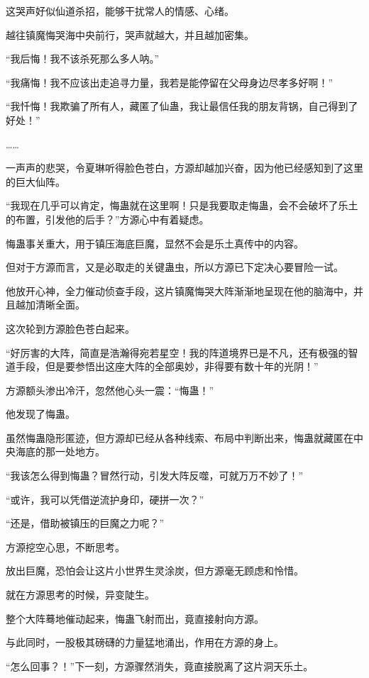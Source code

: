 \begin{this_body}
这哭声好似仙道杀招，能够干扰常人的情感、心绪。

越往镇魔悔哭海中央前行，哭声就越大，并且越加密集。

“我后悔！我不该杀死那么多人呐。”

“我痛悔！我不应该出走追寻力量，我若是能停留在父母身边尽孝多好啊！”

“我忏悔！我欺骗了所有人，藏匿了仙蛊，我让最信任我的朋友背锅，自己得到了好处！”

……

一声声的悲哭，令夏琳听得脸色苍白，方源却越加兴奋，因为他已经感知到了这里的巨大仙阵。

“我现在几乎可以肯定，悔蛊就在这里啊！只是我要取走悔蛊，会不会破坏了乐土的布置，引发他的后手？”方源心中有着疑虑。

悔蛊事关重大，用于镇压海底巨魔，显然不会是乐土真传中的内容。

但对于方源而言，又是必取走的关键蛊虫，所以方源已下定决心要冒险一试。

他放开心神，全力催动侦查手段，这片镇魔悔哭大阵渐渐地呈现在他的脑海中，并且越加清晰全面。

这次轮到方源脸色苍白起来。

“好厉害的大阵，简直是浩瀚得宛若星空！我的阵道境界已是不凡，还有极强的智道手段，但是要参悟出这座大阵的全部奥妙，非得要有数十年的光阴！”

方源额头渗出冷汗，忽然他心头一震：“悔蛊！”

他发现了悔蛊。

虽然悔蛊隐形匿迹，但方源却已经从各种线索、布局中判断出来，悔蛊就藏匿在中央海底的那一处地方。

“我该怎么得到悔蛊？冒然行动，引发大阵反噬，可就万万不妙了！”

“或许，我可以凭借逆流护身印，硬拼一次？”

“还是，借助被镇压的巨魔之力呢？”

方源挖空心思，不断思考。

放出巨魔，恐怕会让这片小世界生灵涂炭，但方源毫无顾虑和怜惜。

就在方源思考的时候，异变陡生。

整个大阵蓦地催动起来，悔蛊飞射而出，竟直接射向方源。

与此同时，一股极其磅礴的力量猛地涌出，作用在方源的身上。

“怎么回事？！”下一刻，方源骤然消失，竟直接脱离了这片洞天乐土。

\end{this_body}

